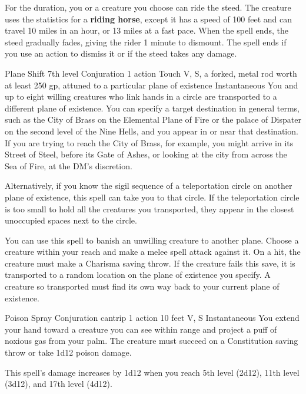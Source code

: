 \documentclass[10pt,a4paper,twoside,bg=print,twocolumn,openany,nodeprecatedcode]{dndbook}
\begin{document}
For the duration, you or a creature you choose can ride the steed. The creature uses the statistics for a \textbf{riding horse}, except it has a speed of 100 feet and can travel 10 miles in an hour, or 13 miles at a fast pace. When the spell ends, the steed gradually fades, giving the rider 1 minute to dismount. The spell ends if you use an action to dismiss it or if the steed takes any damage.



\DndSpellHeader%
{Plane Shift}
{7th level Conjuration}
{1 action}
{Touch}
{V, S, a forked, metal rod worth at least 250 gp, attuned to a particular plane of existence}
{Instantaneous}
You and up to eight willing creatures who link hands in a circle are transported to a different plane of existence. You can specify a target destination in general terms, such as the City of Brass on the Elemental Plane of Fire or the palace of Dispater on the second level of the Nine Hells, and you appear in or near that destination. If you are trying to reach the City of Brass, for example, you might arrive in its Street of Steel, before its Gate of Ashes, or looking at the city from across the Sea of Fire, at the DM's discretion.

Alternatively, if you know the sigil sequence of a teleportation circle on another plane of existence, this spell can take you to that circle. If the teleportation circle is too small to hold all the creatures you transported, they appear in the closest unoccupied spaces next to the circle.

You can use this spell to banish an unwilling creature to another plane. Choose a creature within your reach and make a melee spell attack against it. On a hit, the creature must make a Charisma saving throw. If the creature fails this save, it is transported to a random location on the plane of existence you specify. A creature so transported must find its own way back to your current plane of existence.



\DndSpellHeader%
{Poison Spray}
{Conjuration cantrip}
{1 action}
{10 feet}
{V, S}
{Instantaneous}
You extend your hand toward a creature you can see within range and project a puff of noxious gas from your palm. The creature must succeed on a Constitution saving throw or take 1d12 poison damage.

This spell's damage increases by 1d12 when you reach 5th level (2d12), 11th level (3d12), and 17th level (4d12).
\end{document}

